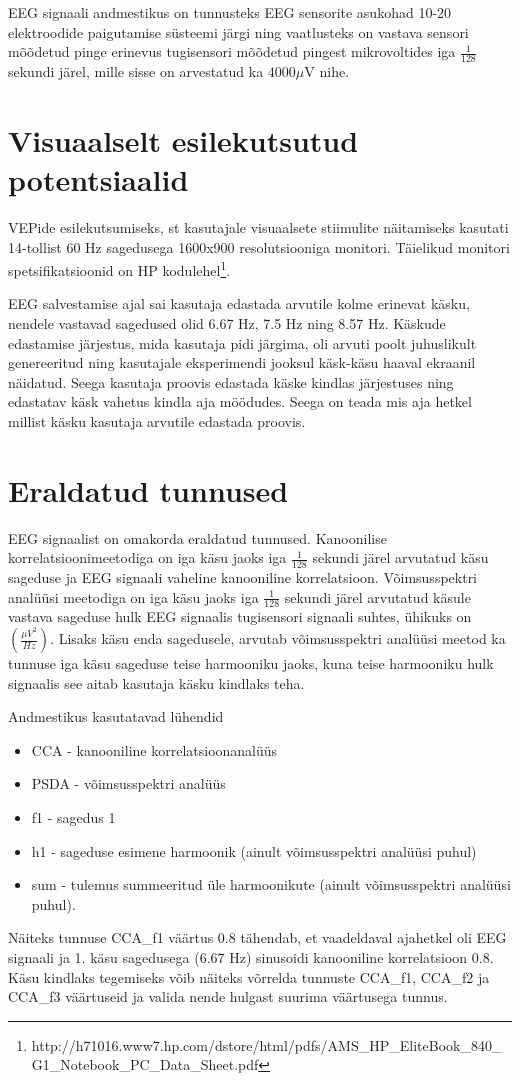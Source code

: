 \documentclass[a4paper,12pt]{report}
\begin{document}
EEG signaali andmestikus on tunnusteks EEG sensorite asukohad 10-20 elektroodide paigutamise süsteemi järgi ning vaatlusteks on vastava sensori mõõdetud pinge erinevus tugisensori mõõdetud pingest mikrovoltides iga $\frac{1}{128}$ sekundi järel, mille sisse on arvestatud ka $4000 \mu$V nihe.

\section{Visuaalselt esilekutsutud potentsiaalid}

VEPide esilekutsumiseks, st kasutajale visuaalsete stiimulite näitamiseks kasutati 14-tollist 60 Hz sagedusega 1600x900 resolutsiooniga monitori. Täielikud monitori spetsifikatsioonid on HP kodulehel\footnote{http://h71016.www7.hp.com/dstore/html/pdfs/AMS\_HP\_EliteBook\_840\_G1\_Notebook\_PC\_Data\_Sheet.pdf}.

EEG salvestamise ajal sai kasutaja edastada arvutile kolme erinevat käsku, nendele vastavad sagedused olid 6.67 Hz, 7.5 Hz ning 8.57 Hz. Käskude edastamise järjestus, mida kasutaja pidi järgima, oli arvuti poolt juhuslikult genereeritud ning kasutajale eksperimendi jooksul käsk-käsu haaval ekraanil näidatud. Seega kasutaja proovis edastada käske kindlas järjestuses ning edastatav käsk vahetus kindla aja möödudes. Seega on teada mis aja hetkel millist käsku kasutaja arvutile edastada proovis.

\section{Eraldatud tunnused}

EEG signaalist on omakorda eraldatud tunnused. Kanoonilise korrelatsioonimeetodiga on iga käsu jaoks iga $\frac{1}{128}$ sekundi järel arvutatud käsu sageduse ja EEG signaali vaheline kanooniline korrelatsioon. Võimsusspektri analüüsi meetodiga on iga käsu jaoks iga $\frac{1}{128}$ sekundi järel arvutatud käsule vastava sageduse hulk EEG signaalis tugisensori signaali suhtes, ühikuks on $\left(\frac{\mu V ^2}{Hz}\right)$. Lisaks käsu enda sagedusele, arvutab võimsusspektri analüüsi meetod ka tunnuse iga käsu sageduse teise harmooniku jaoks, kuna teise harmooniku hulk signaalis see aitab kasutaja käsku kindlaks teha.

Andmestikus kasutatavad lühendid
\begin{itemize}
	\item CCA - kanooniline korrelatsioonanalüüs
	\item PSDA - võimsusspektri analüüs
	\item f1 - sagedus 1
	\item h1 - sageduse esimene harmoonik (ainult võimsusspektri analüüsi puhul)
	\item sum - tulemus summeeritud üle harmoonikute (ainult võimsusspektri analüüsi puhul).
\end{itemize}
Näiteks tunnuse CCA\_f1 väärtus 0.8 tähendab, et vaadeldaval ajahetkel oli EEG signaali ja 1. käsu sagedusega (6.67 Hz) sinusoidi kanooniline korrelatsioon 0.8. Käsu kindlaks tegemiseks võib näiteks võrrelda tunnuste CCA\_f1, CCA\_f2 ja CCA\_f3 väärtuseid ja valida nende hulgast suurima väärtusega tunnus.
\end{document}
